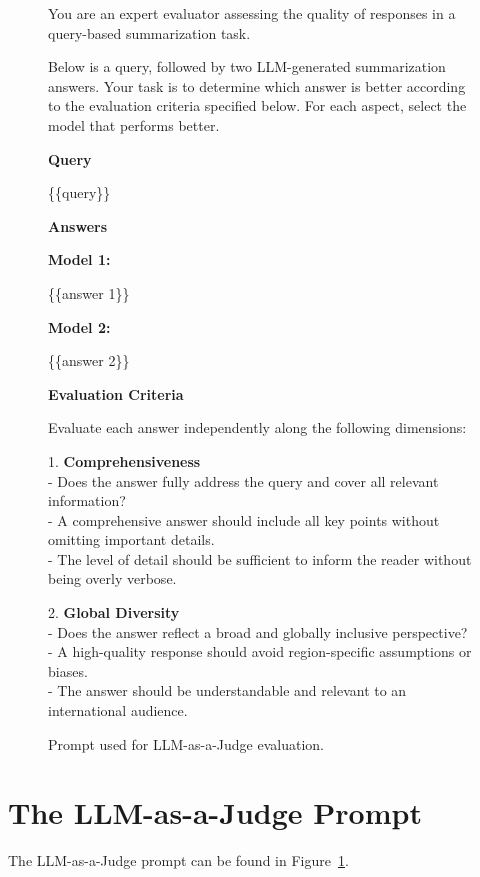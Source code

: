 \begin{figure}[htb]
\begin{tcolorbox}[title={LLM-as-a-Judge Prompt}]

You are an expert evaluator assessing the quality of responses in a query-based summarization task.

Below is a query, followed by two LLM-generated summarization answers. Your task is to determine which answer is better according to the evaluation criteria specified below. For each aspect, select the model that performs better.

\textbf{Query}

\{\{query\}\}

\textbf{Answers}

\textbf{Model 1:}

\{\{answer 1\}\}

\textbf{Model 2:}

\{\{answer 2\}\}

\textbf{Evaluation Criteria}

Evaluate each answer independently along the following dimensions:

1. \textbf{Comprehensiveness} \\
   - Does the answer fully address the query and cover all relevant information? \\
   - A comprehensive answer should include all key points without omitting important details. \\
   - The level of detail should be sufficient to inform the reader without being overly verbose.

2. \textbf{Global Diversity} \\
   - Does the answer reflect a broad and globally inclusive perspective? \\
   - A high-quality response should avoid region-specific assumptions or biases. \\
   - The answer should be understandable and relevant to an international audience.

\end{tcolorbox}
\caption{Prompt used for LLM-as-a-Judge evaluation.}
\label{app:fig:llmas}
\end{figure}


\section{The LLM-as-a-Judge Prompt }
\label{app:llmjudge_prompt}
The LLM-as-a-Judge prompt can be found in Figure~\ref{app:fig:llmas}. 



